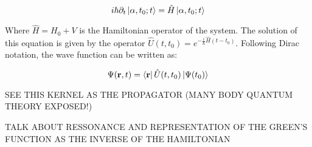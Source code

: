 \begin{equation}
    i\hbar\partial_t\ket{\alpha,t_0;t}=\hat H\ket{\alpha,t_0;t}
\end{equation}

Where $\hat H=H_0+V$ is the Hamiltonian operator of the system. The solution of this equation is given by the operator $\hat U(t,t_0) = e^{-\frac{i}{\hbar}\hat H(t-t_0)}$. Following Dirac notation, the wave function can be written as:

\begin{equation}
    \Psi(\vb r,t)=\bra{\vb r}\hat U(t,t_0)\ket{\Psi(t_0)}
\end{equation}

SEE THIS KERNEL AS THE PROPAGATOR (MANY BODY QUANTUM THEORY EXPOSED!)

TALK ABOUT RESSONANCE AND REPRESENTATION OF THE GREEN'S FUNCTION AS THE INVERSE OF THE HAMILTONIAN

